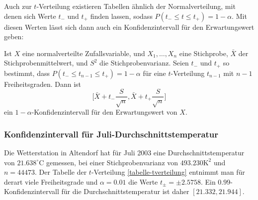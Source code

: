 Auch zur $t$-Verteilung existieren Tabellen ähnlich der Normalverteilung,
mit denen sich Werte $t_-$ und $t_+$ finden lassen, sodass
$P(t_-\le t\le t_+)=1-\alpha$.
Mit diesen Werten lässt sich dann
auch ein Konfidenzintervall für den Erwartungswert geben:

\begin{satz}
Ist $X$ eine normalverteilte Zufallsvariable, und $X_1,\dots,X_n$ eine
Stichprobe, $\bar X$ der Stichprobenmittelwert, 
und $S^2$ die Stichprobenvarianz.
Seien $t_-$ und $t_+$ so bestimmt, dass
$P(t_-\le t_{n-1}\le t_+)=1-\alpha$ für eine $t$-Verteilung $t_{n-1}$ mit
$n-1$ Freiheitsgraden.
Dann ist
\begin{equation}
\biggl[\bar X+t_-\frac{S}{\sqrt{n}},\bar X+t_+\frac{S}{\sqrt{n}}\biggr]
\end{equation}
ein $1-\alpha$-Konfidenzintervall für den Erwartungswert von $X$.
\end{satz}

\subsubsection{Konfidenzintervall für Juli-Durchschnittstemperatur}
Die Wetterstation in Altendorf hat für Juli 2003 eine Durchschnittstemperatur
von $21.638^\circ\text{C}$ gemessen, bei einer Stichprobenvarianz von
$493.230\text{K}^2$ und $n=44473$.
Der Tabelle der $t$-Verteilung
\ref{tabelle-tverteilung} entnimmt man 
für derart
viele Freiheitsgrade und $\alpha=0.01$ die Werte
$t_{\pm}=\pm2.5758$.
Ein $0.99$-Konfidenzintervall für die
Durchschnittstemperatur ist daher
$[21.332, 21.944]$.


